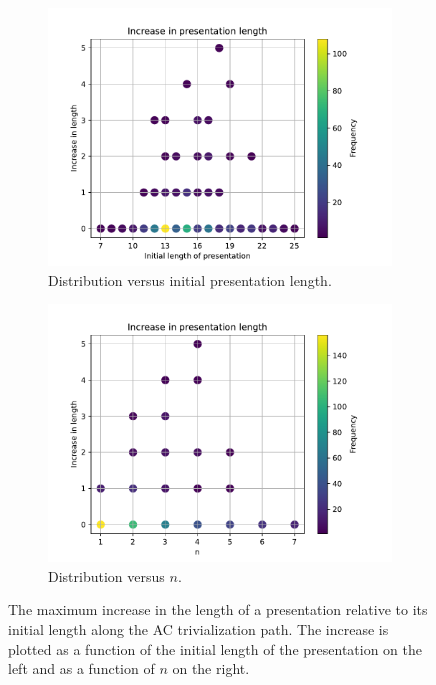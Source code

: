\begin{figure}
	\centering
	\begin{subfigure}[b]{0.5\textwidth}
		\includegraphics[width=\textwidth]{fig/gs_length_increase_vs_length.pdf}
		\caption{Distribution versus initial presentation length.}
		\label{fig:gs_length_increase_vs_length}
	\end{subfigure}%
	\begin{subfigure}[b]{0.5\textwidth}
		\centering
		\includegraphics[width=1.1\textwidth]{fig/gs_length_increase_vs_n.pdf}
		\caption{Distribution versus $n$.}
		\label{fig:gs_length_increase_vs_n}
	\end{subfigure}
	\caption{The maximum increase in the length of a presentation relative to its initial length along the AC trivialization path. The increase is plotted as a function of the initial length of the presentation on the left and as a function of $n$ on the right.} \label{fig:gs_length_increase}
\end{figure}

